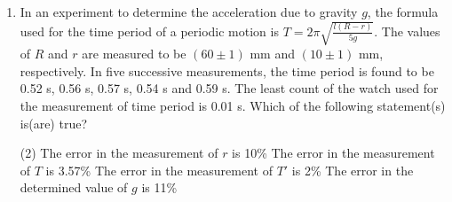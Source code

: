 \begin{enumerate}
    \item In an experiment to determine the acceleration due to gravity \( g \), the formula used for the time period of a periodic motion is \( T = 2\pi\sqrt{\frac{l(R-r)}{5g}} \). The values of \( R \) and \( r \) are measured to be \( (60 \pm 1) \) mm and \( (10 \pm 1) \) mm, respectively. In five successive measurements, the time period is found to be 0.52 s, 0.56 s, 0.57 s, 0.54 s and 0.59 s. The least count of the watch used for the measurement of time period is 0.01 s. Which of the following statement(s) is(are) true?
        \begin{tasks}(2)
            \task The error in the measurement of \( r \) is 10\%
            \task The error in the measurement of \( T \) is 3.57\%
            \task The error in the measurement of \( T' \) is 2\%
            \task The error in the determined value of \( g \) is 11\%
        \end{tasks}
\end{enumerate}